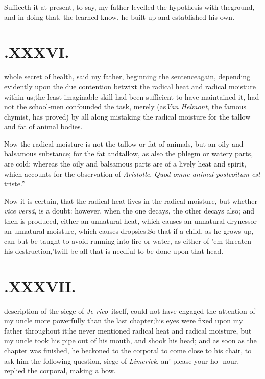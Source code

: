 \documentclass[twoside]{article}
\begin{document}
Sufficeth it at present, to say, my father levelled the
hypothesis with the\break ground, and in doing that, the learned know, he
built up and established his own.\tsh

\vfill
{}
\newpage
\null\smallskip
\section{.\enspace  XXXVI.}

 whole secret of health, said\break
my father, beginning the sentence\break again, depending evidently upon the
due contention betwixt the radical heat and radical moisture within
us;\tsk the least imaginable skill had been sufficient to have
maintained it, had not the school-men confounded the task, merely
(as\break \textit{Van Helmont}, the famous chymist, has proved) by all
along mistaking the radical moisture for the tallow and fat of
animal bodies.

Now the radical moisture is not the tallow or fat of animals,
but an oily and balsamous substance; for the fat and\break tallow, as
also the phlegm or watery parts, are cold; whereas the oily and
balsamous parts are of a lively heat and spirit, which accounts for
the observation of \textit{Aristotle}, \lqq\textit{Quod omne
animal post\break\lqq coitum est} triste.”

Now it is certain, that the radical heat lives in the radical moisture, but whether
\textit{vice versâ}, is a doubt: however, when the one decays, the other decays
also; and then is produced, either an unnatural heat, which causes an unnatural
dryness\tsh or an unnatural moisture, which causes dropsies.\tsh So that if a child,
as he grows up, can but be taught to avoid running into fire or water, as either of
’em threaten his destruction,\tsh ’twill\break
be all that is needful to be done upon\break
that head.\tsh

\vfill
{}
\newpage
\null\smallskip
\section{.\enspace  XXXVII.}

 description of the siege of
\textit{Je-\break rico}\sic\  itself, could not have engaged the attention of my
uncle \toby more\break
powerfully than the last chapter;\tsk his
eyes were fixed upon my father throughout it;\tsk he never
mentioned radical heat and radical moisture, but my uncle
\toby
took his pipe out of his mouth, and\break
shook his head; and as soon as the\break
chapter was finished, he beckoned to\break
the corporal to come close to his chair,\break
to ask him the following question,\break
{} 
\break
siege of \textit{Limerick}, an’ please your ho-\break
nour, replied the corporal, making a\break\etp
bow.
\end{document}
